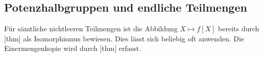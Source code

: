 \subsection{Potenzhalbgruppen und endliche Teilmengen}

Für sämtliche nichtleeren Teilmengen ist die Abbildung \(X\mapsto f[X]\)
bereits durch [thm]
als Isomorphismus bewiesen. Dies lässt sich beliebig oft anwenden.
Die Einermengenkopie wird durch
[thm] erfasst.


